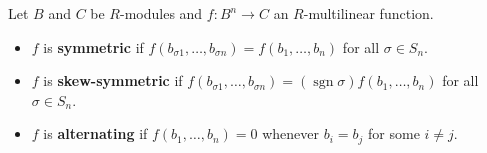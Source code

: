 Let $B$ and $C$ be $R$-modules and $f: B^n \to C$ an $R$-multilinear function.
\begin{itemize}
\item $f$ is \textbf{symmetric} if $f(b_{\sigma 1}, \ldots, b_{\sigma n}) = f(b_1, \ldots, b_n)$ for all $\sigma \in S_n$.
\item $f$ is \textbf{skew-symmetric} if $f(b_{\sigma 1}, \ldots, b_{\sigma n}) = (\operatorname{sgn} \sigma) f(b_1, \ldots, b_n)$ for all $\sigma \in S_n$.
\item $f$ is \textbf{alternating} if $f(b_1, \ldots, b_n) = 0$ whenever $b_i = b_j$ for some $i \neq j$.
\end{itemize}
